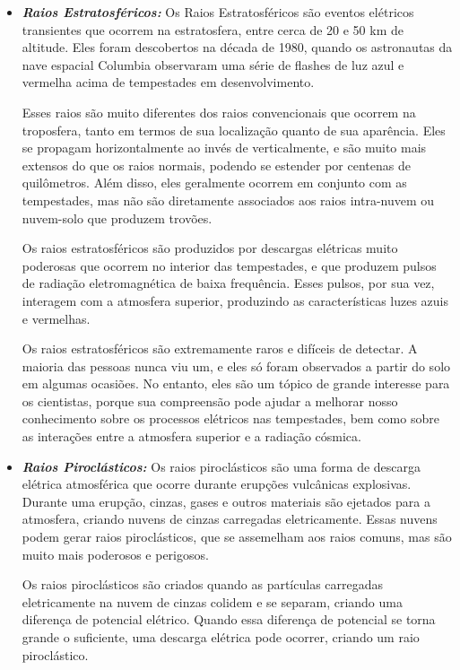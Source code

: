 \documentclass[a4paper, 12pt, onecolumn,singlespacing]{article}
\begin{document}
\begin{itemize}
\begin{itemize}
			\item \textbf{\textit{Raios Estratosféricos: }}Os Raios Estratosféricos são eventos elétricos transientes que ocorrem na estratosfera, entre cerca de 20 e 50 km de altitude. Eles foram descobertos na década de 1980, quando os astronautas da nave espacial Columbia observaram uma série de flashes de luz azul e vermelha acima de tempestades em desenvolvimento.
			
			Esses raios são muito diferentes dos raios convencionais que ocorrem na troposfera, tanto em termos de sua localização quanto de sua aparência. Eles se propagam horizontalmente ao invés de verticalmente, e são muito mais extensos do que os raios normais, podendo se estender por centenas de quilômetros. Além disso, eles geralmente ocorrem em conjunto com as tempestades, mas não são diretamente associados aos raios intra-nuvem ou nuvem-solo que produzem trovões.
			
			Os raios estratosféricos são produzidos por descargas elétricas muito poderosas que ocorrem no interior das tempestades, e que produzem pulsos de radiação eletromagnética de baixa frequência. Esses pulsos, por sua vez, interagem com a atmosfera superior, produzindo as características luzes azuis e vermelhas.
			
			Os raios estratosféricos são extremamente raros e difíceis de detectar. A maioria das pessoas nunca viu um, e eles só foram observados a partir do solo em algumas ocasiões. No entanto, eles são um tópico de grande interesse para os cientistas, porque sua compreensão pode ajudar a melhorar nosso conhecimento sobre os processos elétricos nas tempestades, bem como sobre as interações entre a atmosfera superior e a radiação cósmica.
			
			\item \textbf{\textit{Raios Piroclásticos: }}Os raios piroclásticos são uma forma de descarga elétrica atmosférica que ocorre durante erupções vulcânicas explosivas. Durante uma erupção, cinzas, gases e outros materiais são ejetados para a atmosfera, criando nuvens de cinzas carregadas eletricamente. Essas nuvens podem gerar raios piroclásticos, que se assemelham aos raios comuns, mas são muito mais poderosos e perigosos.
			
			Os raios piroclásticos são criados quando as partículas carregadas eletricamente na nuvem de cinzas colidem e se separam, criando uma diferença de potencial elétrico. Quando essa diferença de potencial se torna grande o suficiente, uma descarga elétrica pode ocorrer, criando um raio piroclástico.
			

\end{itemize}
\end{itemize}
\end{document}
